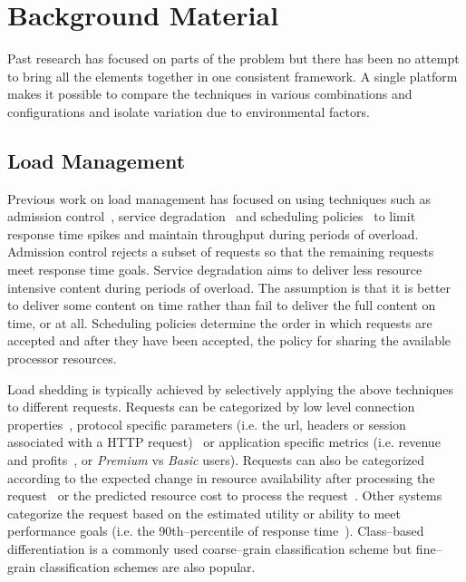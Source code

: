 \documentclass[conference,a4paper,final]{IEEEtran}
\begin{document}
\section{Background Material}

Past research has focused on parts of the problem but there has been no attempt to bring all the elements together in one consistent framework. A single platform makes it possible to compare the techniques in various combinations and configurations and isolate variation due to environmental factors.

\subsection{Load Management}

Previous work on load management has focused on using techniques such as admission control~\cite{Voigt:2001qe,Cherkasova:2002yb,srinivas00webk,Kanodia:2000qv,welsh03Adaptive,Elnikety:2004ty}, service degradation~\cite{welsh03Adaptive,abdelzaher99web} and scheduling policies~\cite{Zhou06RequestAware,Behren03Capriccio,Schroeder06Overload,Crovella99Alpha,Cherkasova1998Strategy,Larus:2002:Cohort} to limit response time spikes and maintain throughput during periods of overload. Admission control rejects a subset of requests so that the remaining requests meet response time goals. Service degradation aims to deliver less resource intensive content during periods of overload. The assumption is that it is better to deliver some content on time rather than fail to deliver the full content on time, or at all. Scheduling policies determine the order in which requests are accepted and after they have been accepted, the policy for sharing the available processor resources.

Load shedding is typically achieved by selectively applying the above techniques to different requests. Requests can be categorized by low level connection properties~\cite{Voigt:2001qe}, protocol specific parameters (i.e. the url, headers or session associated with a HTTP request)~\cite{Cherkasova:2002yb,Voigt:2001qe} or application specific metrics (i.e. revenue and profits~\cite{Menasec:2000ty}, or \emph{Premium} vs \emph{Basic} users). Requests can also be categorized according to the expected change in resource availability after processing the request~\cite{Behren03Capriccio} or the predicted resource cost to process the request~\cite{Crovella99Alpha}. Other systems categorize the request based on the estimated utility\cite{Zhou06RequestAware} or ability to meet performance goals (i.e. the 90th--percentile of response time~\cite{welsh03Adaptive}). Class--based differentiation is a commonly used coarse--grain classification scheme but fine--grain classification schemes are also popular.
\end{document}
